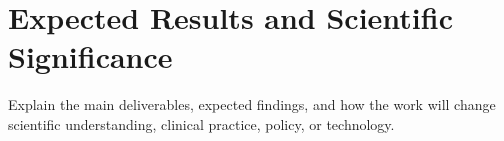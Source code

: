 \section{Expected Results and Scientific Significance}

Explain the main deliverables, expected findings, and how the work will
change scientific understanding, clinical practice, policy, or
technology.
